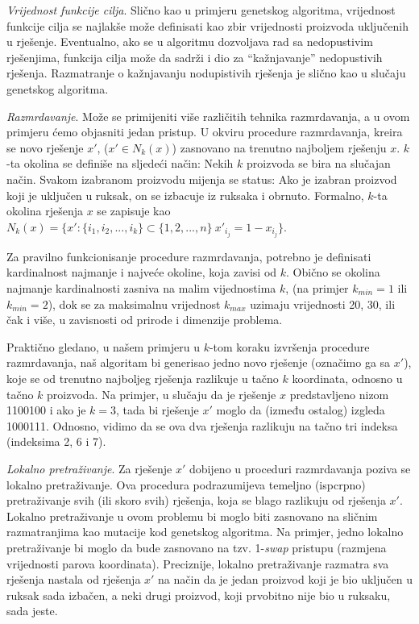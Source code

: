 \documentclass[a4paper, utf8, 11pt, colorlinks]{book}
\theoremstyle{definition}
\begin{document}
\emph{Vrijednost funkcije cilja}. Slično kao u primjeru genetskog algoritma, vrijednost funkcije cilja se najlakše može definisati kao zbir vrijednosti proizvoda uključenih u rješenje. Eventualno, ako se u algoritmu dozvoljava rad sa nedopustivim rješenjima, funkcija cilja može da sadrži i dio za ``kažnjavanje'' nedopustivih rješenja. Razmatranje o kažnjavanju nodupistivih rješenja je slično kao u slučaju genetskog algoritma.

\emph{Razmrdavanje}. Može se primijeniti više različitih tehnika razmrdavanja, a u ovom primjeru ćemo objasniti jedan pristup. 
U okviru procedure razmrdavanja, kreira se novo rješenje $x'$, ($x' \in N_k(x)$) zasno\-vano na trenutno najboljem rješenju  $x$.
$k$-ta okolina se definiše na sljedeći način: Nekih $k$ proizvoda se bira na slučajan način. Svakom izabranom proizvodu mijenja se status: Ako je izabran proizvod koji je uključen u ruksak, on se izbacuje iz ruksaka i obrnuto. Formalno, $k$-ta okolina rješenja
$x$ se zapisuje kao  $N_k(x) = \{x':  \{i_1,i_2,...,i_k\}\subset \{1,2,...,n\}\  x'_{i_j}=1-x_{i_j}\}$.

Za pravilno funkcionisanje procedure razmrdavanja, potrebno je definisati kardinalnost najmanje i najveće okoline, koja zavisi od $k$. Obično se okolina najmanje kardinalnosti zasniva na malim vijednostima $k$, (na primjer $k_{min}=1$ ili $k_{min}=2$), dok se za maksimalnu vrijednost $k_{max}$  uzimaju vrijednosti 20, 30, ili čak i više, u zavisnosti od prirode i dimenzije problema.

Praktično gledano, u našem primjeru u $k$-tom koraku izvršenja procedure razmrdavanja, naš algoritam bi generisao jedno novo rješenje (označimo ga sa $x'$), koje se od trenutno najboljeg rješenja razlikuje u tačno $k$ koordinata, odnosno u tačno $k$ proizvoda. Na primjer, u slučaju da je rješenje $x$ predstavljeno nizom 1100100 i ako je $k=3$, tada bi rješenje    $x'$ moglo da  (između ostalog) izgleda
1000111. Odnosno, vidimo da se ova dva rješenja razlikuju na tačno tri indeksa (indeksima 2, 6 i 7).

\emph{Lokalno pretraživanje}. 
Za rješenje  $x'$ dobijeno u  proceduri razmrdavanja poziva se lokalno pretraživanje. Ova procedura podrazumijeva temeljno (ispcrpno) pretraživanje svih (ili skoro svih) rješenja, koja se blago razlikuju od rješenja  $x'$. Lokalno pretraživanje u ovom problemu bi moglo biti zasnovano na sličnim razmatranjima kao mutacije kod genetskog algoritma. Na primjer, jedno lokalno pretraživanje bi moglo da bude zasnovano na tzv. 1-\emph{swap} pristupu (razmjena vrijednosti parova koordinata). Preciznije, lokalno pretraživanje razmatra sva rješenja nastala od rješenja $x'$ na način da je jedan proizvod koji je bio uključen u ruksak sada izbačen, a neki drugi proizvod, koji prvobitno nije bio u ruksaku, sada jeste.
\end{document}
